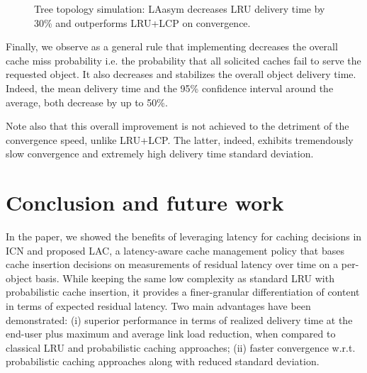 \documentclass[conference]{IEEEtran}
\begin{document}
 \begin{figure*}[htbp] 
 \centering
 \caption{Tree topology simulation:  LAasym decreases LRU delivery time by 30\% and outperforms LRU+LCP on convergence.}
 \label{tree_topology_results}
 \end{figure*}
 
Finally, we observe as a general rule that implementing  decreases the
overall cache miss probability i.e. the probability that all solicited caches fail to serve the
requested object. It also decreases and stabilizes the overall object delivery time. Indeed, the mean delivery time and the 95\% confidence interval around the average, both decrease by up to 50\%. 

Note also that this overall improvement is not achieved to the detriment of the convergence speed, unlike LRU+LCP. The latter, indeed, exhibits tremendously slow convergence and extremely high delivery time standard deviation.

\section{Conclusion and future work}
\label{sec:conclusion}
In the paper, we showed the benefits of leveraging latency for caching decisions in ICN and proposed LAC, a latency-aware cache management policy that bases cache insertion decisions on measurements of residual latency over time on a per-object basis. 
While keeping the same low complexity as standard LRU with probabilistic cache insertion, it provides a finer-granular differentiation of content in terms of expected residual latency. 
Two main advantages have been demonstrated: (i) superior performance in terms of realized delivery time at the end-user plus maximum and average link load reduction, when compared to classical LRU and probabilistic caching approaches; (ii) faster convergence w.r.t. probabilistic caching approaches along with reduced standard deviation. 
\end{document}
